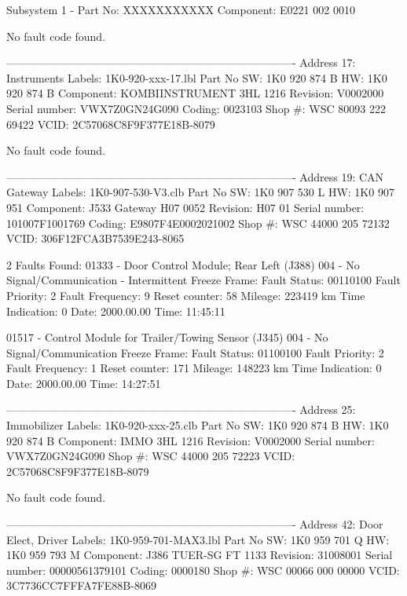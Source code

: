    Subsystem 1 - Part No: XXXXXXXXXXX 
   Component: E0221           002 0010

No fault code found.

-------------------------------------------------------------------------------
Address 17: Instruments        Labels: 1K0-920-xxx-17.lbl
   Part No SW: 1K0 920 874 B    HW: 1K0 920 874 B
   Component: KOMBIINSTRUMENT 3HL 1216  
   Revision: V0002000    Serial number: VWX7Z0GN24G090
   Coding: 0023103
   Shop #: WSC 80093 222 69422
   VCID: 2C57068C8F9F377E18B-8079

No fault code found.

-------------------------------------------------------------------------------
Address 19: CAN Gateway        Labels: 1K0-907-530-V3.clb
   Part No SW: 1K0 907 530 L    HW: 1K0 907 951 
   Component: J533  Gateway   H07 0052  
   Revision:   H07 01    Serial number: 101007F1001769
   Coding: E9807F4E0002021002
   Shop #: WSC 44000 205 72132
   VCID: 306F12FCA3B7539E243-8065

2 Faults Found:
01333 - Door Control Module; Rear Left (J388) 
            004 - No Signal/Communication - Intermittent
             Freeze Frame:
                    Fault Status: 00110100
                    Fault Priority: 2
                    Fault Frequency: 9
                    Reset counter: 58
                    Mileage: 223419 km
                    Time Indication: 0
                    Date: 2000.00.00
                    Time: 11:45:11

01517 - Control Module for Trailer/Towing Sensor (J345) 
            004 - No Signal/Communication
             Freeze Frame:
                    Fault Status: 01100100
                    Fault Priority: 2
                    Fault Frequency: 1
                    Reset counter: 171
                    Mileage: 148223 km
                    Time Indication: 0
                    Date: 2000.00.00
                    Time: 14:27:51


-------------------------------------------------------------------------------
Address 25: Immobilizer        Labels: 1K0-920-xxx-25.clb
   Part No SW: 1K0 920 874 B    HW: 1K0 920 874 B
   Component: IMMO            3HL 1216  
   Revision: V0002000    Serial number: VWX7Z0GN24G090
   Shop #: WSC 44000 205 72223
   VCID: 2C57068C8F9F377E18B-8079

No fault code found.

-------------------------------------------------------------------------------
Address 42: Door Elect, Driver        Labels: 1K0-959-701-MAX3.lbl
   Part No SW: 1K0 959 701 Q    HW: 1K0 959 793 M
   Component: J386  TUER-SG FT    1133  
   Revision: 31008001    Serial number: 00000561379101
   Coding: 0000180
   Shop #: WSC 00066 000 00000
   VCID: 3C7736CC7FFFA7FE88B-8069

